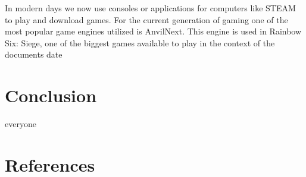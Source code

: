 \documentclass[letterpaper, 10 pt, conference]{IEEEconf}
\begin{document}
In modern days we now use consoles or applications for computers like STEAM to play and download games. 
For the current generation of gaming one of the most popular game engines utilized is AnvilNext. This 
engine is used in Rainbow Six: Siege, one of the biggest games available to play in the context of the 
documents date
\section{Conclusion}
everyone
\section{References}
\end{document}
